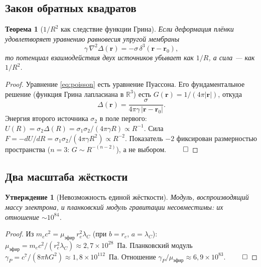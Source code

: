 \documentclass[12pt,a4paper]{article}
\newtheorem{theorem}{Теорема}
\newtheorem{proposition}{Утверждение}
\begin{document}
\subsection{Закон обратных квадратов}
\begin{theorem}[$1/R^2$ как следствие функции Грина]
\label{th:invsq}
Если деформация плёнки удовлетворяет уравнению равновесия упругой мембраны
\begin{equation}
\gamma\,\nabla^2\Delta(\mathbf{r})=-\sigma\,\delta^3(\mathbf{r}-\mathbf{r}_0),
\label{eq:poisson}
\end{equation}
то потенциал взаимодействия двух источников убывает как $1/R$, а сила --- как
$1/R^2$.
\end{theorem}
\begin{proof}
Уравнение \eqref{eq:poisson} есть уравнение Пуассона. Его фундаментальное решение
(функция Грина лапласиана в $\mathbb{R}^3$) есть
$G(\mathbf{r})=1/(4\pi|\mathbf{r}|)$, откуда
\begin{equation}
\Delta(\mathbf{r})=\frac{\sigma}{4\pi\gamma\,|\mathbf{r}-\mathbf{r}_0|}.
\end{equation}
Энергия второго источника $\sigma_2$ в поле первого:
$U(R)=\sigma_2\Delta(R)=\sigma_1\sigma_2/(4\pi\gamma R)\propto R^{-1}$.
Сила $F=-dU/dR=\sigma_1\sigma_2/(4\pi\gamma R^2)\propto R^{-2}$.
Показатель $-2$ фиксирован размерностью пространства ($n=3$: $G\sim R^{-(n-2)}$),
а не выбором. $\qed$
\end{proof}

\subsection{Два масштаба жёсткости}
\begin{proposition}[Невозможность единой жёсткости]
Модуль, воспроизводящий массу электрона, и планковский модуль гравитации
несовместимы: их отношение $\sim 10^{84}$.
\end{proposition}
\begin{proof}
Из $m_e c^2=\mu_{\text{эфир}}\,r_e^2\lambda_C$ (при $b=r_e$, $a=\lambda_C$):
$\mu_{\text{эфир}}=m_ec^2/(r_e^2\lambda_C)\approx2{,}7\times10^{28}$~Па.
Планковский модуль $\gamma_P=c^7/(8\pi\hbar G^2)\approx1{,}8\times10^{112}$~Па.
Отношение $\gamma_P/\mu_{\text{эфир}}\approx6{,}9\times10^{83}$. $\qed$
\end{proof}
\end{document}
